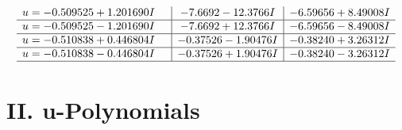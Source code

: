 \documentclass[1p]{elsarticle_modified}
\theoremstyle{definition}
\begin{document}
$$\begin{array}{c|c|c}
\begin{aligned}
u &= -0.509525 + 1.201690 I\end{aligned}
 & -7.6692 - 12.3766 I & -6.59656 + 8.49008 I \\ \hline\begin{aligned}
u &= -0.509525 - 1.201690 I\end{aligned}
 & -7.6692 + 12.3766 I & -6.59656 - 8.49008 I \\ \hline\begin{aligned}
u &= -0.510838 + 0.446804 I\end{aligned}
 & -0.37526 - 1.90476 I & -0.38240 + 3.26312 I \\ \hline\begin{aligned}
u &= -0.510838 - 0.446804 I\end{aligned}
 & -0.37526 + 1.90476 I & -0.38240 - 3.26312 I\\
 \hline 
 \end{array}$$\newpage
\newpage\renewcommand{\arraystretch}{1}
\centering \section*{ II. u-Polynomials}
\end{document}
